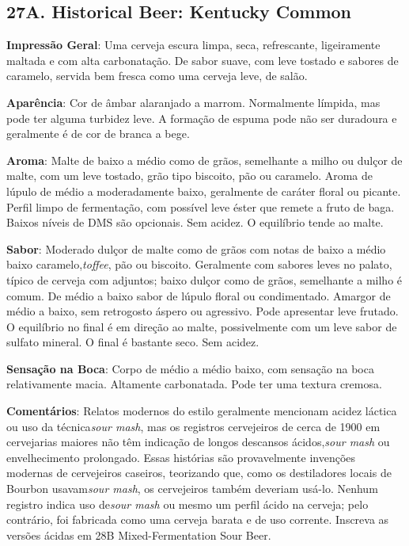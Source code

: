 \subsection*{27A. Historical Beer: Kentucky Common}
\textbf{Impressão Geral}: Uma cerveja escura limpa, seca, refrescante, ligeiramente maltada e com alta carbonatação. De sabor suave, com leve tostado e sabores de caramelo, servida bem fresca como uma cerveja leve, de salão.

\textbf{Aparência}: Cor de âmbar alaranjado a marrom. Normalmente límpida, mas pode ter alguma turbidez leve. A formação de espuma pode não ser duradoura e geralmente é de cor de branca a bege.

\textbf{Aroma}: Malte de baixo a médio como de grãos, semelhante a milho ou dulçor de malte, com um leve tostado, grão tipo biscoito, pão ou caramelo. Aroma de lúpulo de médio a moderadamente baixo, geralmente de caráter floral ou picante. Perfil limpo de fermentação, com possível leve éster que remete a fruto de baga. Baixos níveis de DMS são opcionais. Sem acidez. O equilíbrio tende ao malte.

\textbf{Sabor}: Moderado dulçor de malte como de grãos com notas de baixo a médio baixo caramelo,\textit{toffee}, pão ou biscoito. Geralmente com sabores leves no palato, típico de cerveja com adjuntos; baixo dulçor como de grãos, semelhante a milho é comum. De médio a baixo sabor de lúpulo floral ou condimentado. Amargor de médio a baixo, sem retrogosto áspero ou agressivo. Pode apresentar leve frutado. O equilíbrio no final é em direção ao malte, possivelmente com um leve sabor de sulfato mineral. O final é bastante seco. Sem acidez.

\textbf{Sensação na Boca}: Corpo de médio a médio baixo, com sensação na boca relativamente macia. Altamente carbonatada. Pode ter uma textura cremosa.

\textbf{Comentários}: Relatos modernos do estilo geralmente mencionam acidez láctica ou uso da técnica\textit{sour mash}, mas os registros cervejeiros de cerca de 1900 em cervejarias maiores não têm indicação de longos descansos ácidos,\textit{sour mash} ou envelhecimento prolongado. Essas histórias são provavelmente invenções modernas de cervejeiros caseiros, teorizando que, como os destiladores locais de Bourbon usavam\textit{sour mash}, os cervejeiros também deveriam usá-lo. Nenhum registro indica uso de\textit{sour mash} ou mesmo um perfil ácido na cerveja; pelo contrário, foi fabricada como uma cerveja barata e de uso corrente. Inscreva as versões ácidas em 28B Mixed-Fermentation Sour Beer.

